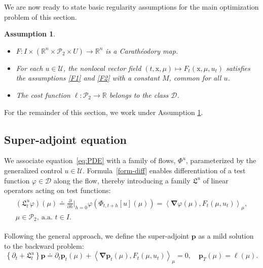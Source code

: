 \documentclass[sn-mathphys-num]{sn-jnl}
\numberwithin{equation}{section}
\theoremstyle{mythm}
\theoremstyle{mydef}
\newtheorem{assumption}{Assumption}\renewcommand{\theassumption}{(A\arabic{assumption})}  %
\renewcommand{\phi}{\varphi}
\begin{document}
We are now ready to state basic regularity assumptions for the main optimization problem of this section.

\begin{tcolorbox}
\begin{assumption}
\label{a3}
~
\begin{itemize}
  \item \( F\colon I \times (\mathbb{R}^n \times \mathcal{P}_2 \times U) \to \mathbb{R}^n \) is a Carath\'eodory map.
  \item For each \( u \in \mathcal{U} \), the nonlocal vector field \( (t,\mathrm x,\mu)\mapsto F_t(\mathrm{x},\mu,u_t)  \) satisfies the assumptions \ref{F1} and \ref{F2} with a constant \( M \), common for all \( u \).
  \item The cost function \( \ell\colon \mathcal{P}_2\to \mathbb{R} \) belongs to the class \( \bm{\mathcal D} \).
\end{itemize}
\end{assumption}
\end{tcolorbox}

For the remainder of this section, we work under Assumption \ref{a3}.



\subsection{Super-adjoint equation}

We associate equation~\eqref{eq:PDE} with a family of  flows, \( \Phi^u \), parameterized by the generalized control \( u \in {\mathcal U} \).  Formula~\eqref{form-diff} enables differentiation of a test function \( \phi \in \bm{\mathcal D} \) along the flow, thereby introducing a family \( \mathfrak{L}^u \) of linear operators acting on test functions:  
\begin{align}\label{Lnlc}
\begin{array}{c}
\displaystyle\left(\mathfrak{L}_t^u\phi\right)(\mu) \doteq \frac{\partial}{\partial h}\big|_{h=0}\phi\left(\Phi_{t,t+h}[u](\mu)\right) 
  = \left<\bm \nabla \phi(\mu), F_t(\mu,u_t)\right>_{\mu},\\[0.4cm]
  \mu \in \mathcal{P}_2, \ \text{a.a. } t \in I.
  \end{array}
\end{align}

Following the general approach, we define the super-adjoint \( \bm p \) as a mild solution to the backward problem:
\begin{equation}
  \label{eq:Wadjoint}
  \left\{\partial_t + \mathfrak{L}_t^u\right\}\bm p 
  \doteq \partial_t \bm p_t(\mu) + \left< \bm \nabla \bm p_t(\mu), F_t(\mu,u_t) \right>_{\mu} = 0, 
  \quad \bm p_T(\mu) = \ell(\mu).
\end{equation}
\end{document}
